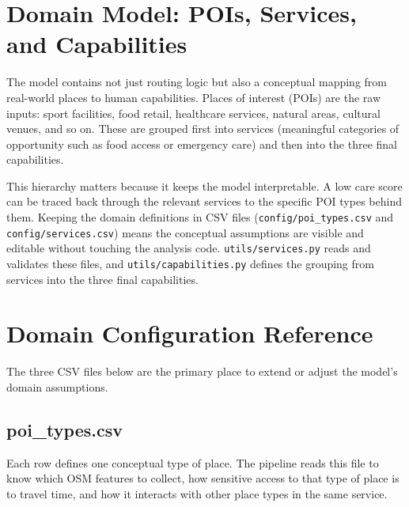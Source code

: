 \documentclass[11pt]{article}
\begin{document}
\section{Domain Model: POIs, Services, and Capabilities}

The model contains not just routing logic but also a conceptual mapping from real-world places to human capabilities. Places of interest (POIs) are the raw inputs: sport facilities, food retail, healthcare services, natural areas, cultural venues, and so on. These are grouped first into services (meaningful categories of opportunity such as food access or emergency care) and then into the three final capabilities.

This hierarchy matters because it keeps the model interpretable. A low care score can be traced back through the relevant services to the specific POI types behind them. Keeping the domain definitions in CSV files (\texttt{config/poi\_types.csv} and \texttt{config/services.csv}) means the conceptual assumptions are visible and editable without touching the analysis code. \texttt{utils/services.py} reads and validates these files, and \texttt{utils/capabilities.py} defines the grouping from services into the three final capabilities.

\section{Domain Configuration Reference}

The three CSV files below are the primary place to extend or adjust the model's domain assumptions.

\subsection*{poi\_types.csv}

Each row defines one conceptual type of place. The pipeline reads this file to know which OSM features to collect, how sensitive access to that type of place is to travel time, and how it interacts with other place types in the same service.
\end{document}
